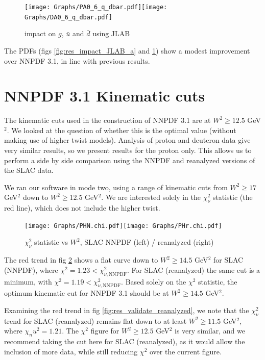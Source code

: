 \documentclass[12pt,a4paper]{report}
\begin{document}
\begin{figure}[H]
\begin{center}
\texttt{[image: Graphs/PA0\_6\_q\_dbar.pdf]}\texttt{[image: Graphs/DA0\_6\_q\_dbar.pdf]}
\caption{impact on $g$, $\bar{u}$ and $\bar{d}$ using JLAB}
\label{fig:res_impact_JLAB_b}
\end{center}
\end{figure}

The PDFs (figs \ref{fig:res_impact_JLAB_a} and \ref{fig:res_impact_JLAB_b}) show a modest improvement over NNPDF 3.1, in line with previous results.

\section{NNPDF 3.1 Kinematic cuts}

The kinematic cuts used in the construction of NNPDF 3.1 \cite[pg 9]{NNPDF31} are at $W^2 \ge 12.5$ GeV$^2$. We looked at the question of whether this is the optimal value (without making use of higher twist models). Analysis of proton and deuteron data give very similar results, so we present results for the proton only. This allows us to perform a side by side comparison using the NNPDF and reanalyzed versions of the SLAC data.

We ran our software in mode two, using a range of kinematic cuts from $W^2 \ge 17$ GeV$^2$ down to $W^2 \ge 12.5$ GeV$^2$. We are interested solely in the $\chi_\nu^2$ statistic (the red line), which does not include the higher twist.

\begin{figure}[ht]
\begin{center}
\texttt{[image: Graphs/PHN.chi.pdf]}\texttt{[image: Graphs/PHr.chi.pdf]}\\
\caption{$\chi_\nu^2$ statistic vs $W^2$, SLAC NNPDF (left) / reanalyzed (right)}
\label{fig:res_validate_NNPDF_cuts}
\end{center}
\end{figure}

The red trend in fig \ref{fig:res_validate_NNPDF_cuts} shows a flat curve down to $W^2 \ge 14.5$ GeV$^2$ for SLAC (NNPDF), where $\chi^2 = 1.23 < \chi_{\nu,\textrm{NNPDF}}^2$. For SLAC (reanalyzed) the same cut is a minimum, with $\chi^2 = 1.19 < \chi_{\nu,\textrm{NNPDF}}^2$. Based solely on the $\chi^2$ statistic, the optimum kinematic cut for NNPDF 3.1 should be at $W^2 \ge 14.5$ GeV$^2$.

Examining the red trend in fig \ref{fig:res_validate_reanalyzed}, we note that the $\chi_\nu^2$ trend for SLAC (reanalyzed) remains flat down to at least $W^2 \ge 11.5$ GeV$^2$, where $\chi_nu^2=1.21$. The $\chi^2$ figure for $W^2 \ge 12.5$ GeV$^2$ is very similar, and we recommend taking the cut here for SLAC (reanalyzed), as it would allow the inclusion of more data, while still reducing $\chi^2$ over the current figure.
\end{document}
